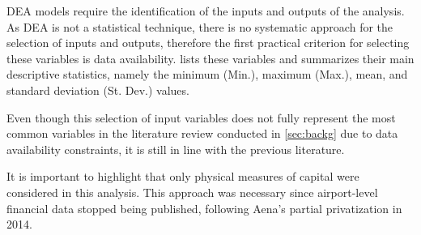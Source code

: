 DEA models require the identification of the inputs and outputs of the analysis. As DEA is not a
statistical technique, there is no systematic approach for the selection of inputs and outputs, therefore the first practical criterion for selecting these
variables is data availability.  lists these variables
and summarizes their main descriptive statistics, namely the minimum (Min.), maximum (Max.), mean,
and standard deviation (St. Dev.) values.


\begin{table}[h!]
  \begin{center}
    \caption{Summary Statistics for Input and Output Variables (2016–2023)}
    \label{tab:variables}
  \end{center}
\end{table}
  \vspace{-0.5cm}
Even though this selection of input variables does not fully
represent the most common variables in the literature review conducted in \autoref{sec:backg} due to data availability constraints, it is still in line with the previous literature.

It is important to highlight that only physical measures of capital were considered in this analysis. This
approach was necessary since airport-level financial data stopped being published, following Aena’s partial privatization in 2014.

